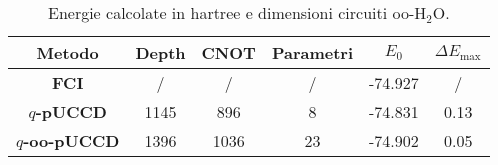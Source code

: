 \begin{table}[H]
    \centering
    \begin{tabular}{|c|c|c|c|c|c|}
    \hline
    \textbf{Metodo} & \textbf{Depth} & \textbf{CNOT} & \textbf{Parametri} & \textbf{$E_0$} & \textbf{$\Delta E_{\text{max}}$} \\ \hline
    \textbf{\color[HTML]{CB0000} FCI}           & /      & /      & /     & -74.927   & /       \\ \hline
    \textbf{\color[HTML]{D952D8} $q$-pUCCD}     & 1145   & 896    & 8     & -74.831   & 0.13    \\ \hline
    \textbf{\color[HTML]{6200C9} $q$-oo-pUCCD}  & 1396   & 1036   & 23    & -74.902   & 0.05    \\ \hline
\end{tabular}
\caption{Energie calcolate in hartree e dimensioni circuiti oo-H$_2$O.}
\label{tab:oo-H2O}
\end{table}